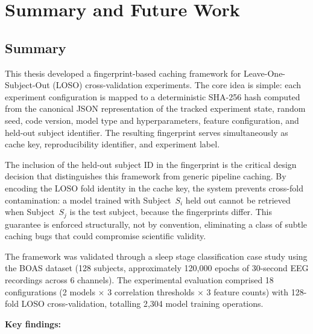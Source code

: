 \chapter{Summary and Future Work}
\label{chap:summary}


\section{Summary}

This thesis developed a fingerprint-based caching framework for
Leave-One-Subject-Out (LOSO) cross-validation experiments. The core idea is
simple: each experiment configuration is mapped to a deterministic SHA-256
hash computed from the canonical JSON representation of the tracked experiment
state, random seed, code version, model type and hyperparameters, feature
configuration, and held-out subject identifier. The resulting fingerprint
serves simultaneously as cache key, reproducibility identifier, and
experiment label.

The inclusion of the held-out subject ID in the fingerprint is the critical
design decision that distinguishes this framework from generic pipeline
caching. By encoding the LOSO fold identity in the cache key, the system
prevents cross-fold contamination: a model trained with Subject~$S_i$ held
out cannot be retrieved when Subject~$S_j$ is the test subject, because the
fingerprints differ. This guarantee is enforced structurally, not by
convention, eliminating a class of subtle caching bugs that could
compromise scientific validity.

The framework was validated through a sleep stage classification case study
using the BOAS dataset (128 subjects, approximately 120{,}000 epochs of
30-second EEG recordings across 6 channels). The experimental evaluation
comprised 18 configurations (2 models $\times$ 3 correlation thresholds
$\times$ 3 feature counts) with 128-fold LOSO cross-validation, totalling
2{,}304 model training operations.

\textbf{Key findings:}

